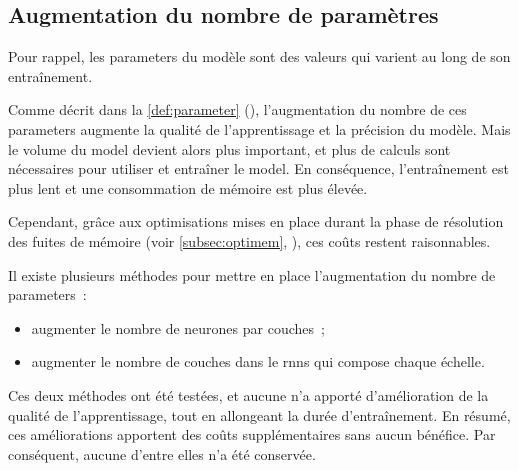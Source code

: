 \pagebreak
\subsection{Augmentation du nombre de paramètres}\label{subsec:optiparam}
Pour rappel, les \glspl{parameter} du modèle sont des valeurs qui varient au long de son entraînement.

Comme décrit dans la \autoref{def:parameter} (), %
l'augmentation du nombre de ces \glspl{parameter} augmente la qualité de l'apprentissage et la précision du modèle. Mais le volume du \gls{model} devient alors plus important, et plus de calculs sont nécessaires pour utiliser et entraîner le \gls{model}. En conséquence, l'entraînement est plus lent et une consommation de mémoire est plus élevée.

Cependant, grâce aux optimisations mises en place durant la phase de résolution des fuites de mémoire (voir \autoref{subsec:optimem}, ), ces coûts restent raisonnables.

Il existe plusieurs méthodes pour mettre en place l'augmentation du nombre de \glspl{parameter}~:
\begin{itemize}
	\item augmenter le nombre de neurones par couches~;
	\item augmenter le nombre de couches dans le \glspl{rnn} qui compose chaque \og échelle\fg{}.
\end{itemize}
\vspace{1em}

Ces deux méthodes ont été testées, et aucune n'a apporté d'amélioration de la qualité de l'apprentissage, tout en allongeant la durée d'entraînement.
En résumé, ces améliorations apportent des coûts supplémentaires sans aucun bénéfice. Par conséquent, aucune d'entre elles n'a été conservée.